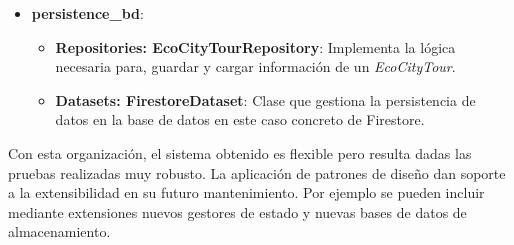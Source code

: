 \begin{itemize}
	\item \textbf{persistence\_bd}:
	\begin{itemize}
		\item \textbf{Repositories: EcoCityTourRepository}: Implementa la lógica necesaria para, guardar y cargar información de un \textit{EcoCityTour}.
		\item \textbf{Datasets: FirestoreDataset}: Clase que gestiona la persistencia de datos en la base de datos en este caso concreto de Firestore.
	\end{itemize}
\end{itemize}

Con esta organización, el sistema obtenido es flexible pero resulta dadas las pruebas realizadas muy robusto. La aplicación de patrones de diseño dan soporte a la extensibilidad en su futuro mantenimiento. Por ejemplo se pueden incluir mediante extensiones nuevos gestores de estado y nuevas bases de datos de almacenamiento.

